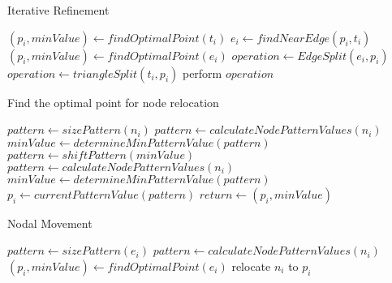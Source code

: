 \begin{algorithm}[H]
\caption{Iterative Refinement}
\label{alg_IterativeRefinement}
\begin{algorithmic}
 
    \State $\left( p_i, minValue \right) \gets findOptimalPoint\left( t_i \right)$
      \State $e_i \gets findNearEdge\left( p_i, t_i \right)$
      \State $\left( p_i, minValue \right) \gets findOptimalPoint\left( e_i \right)$
      \State $operation \gets EdgeSplit\left( e_i, p_i \right)$
    \Else
      \State $operation \gets triangleSplit\left( t_i, p_i \right)$
    \EndIf
      \State perform $operation$
    \EndIf
  \EndFor
\EndProcedure
\end{algorithmic}
\end{algorithm}

\begin{algorithm}
\begin{algorithmic}
\caption{Find the optimal point for node relocation}
\label{alg_NodeSmoothing}
 
  \State $pattern \gets sizePattern\left( n_i \right)$
  \State $pattern \gets calculateNodePatternValues\left( n_i \right)$
  \State $minValue \gets determineMinPatternValue\left( pattern \right)$
    \State $pattern \gets shiftPattern\left( minValue \right)$
    \State $pattern \gets calculateNodePatternValues\left( n_i \right)$
    \State $minValue \gets determineMinPatternValue\left( pattern \right)$
  \EndWhile
  \State $p_i \gets currentPatternValue\left( pattern \right)$
  \State $return \gets \left( p_i, minValue \right)$
\EndProcedure
\end{algorithmic}
\end{algorithm}

\begin{algorithm}[H]
\caption{Nodal Movement}
\begin{algorithmic}
 
    \State $pattern \gets sizePattern\left( e_i \right)$
    \State $pattern \gets calculateNodePatternValues\left( n_i \right)$
    \State $\left( p_i, minValue \right) \gets findOptimalPoint\left( e_i \right)$
  \EndFor
    \State relocate $n_i$ to $p_i$
  \EndIf
\EndProcedure
\end{algorithmic}
\end{algorithm}
